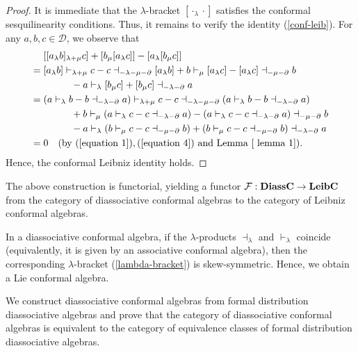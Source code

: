 \documentclass[a4paper,reqno,10pt]{amsart}
\theoremstyle{plain}
\theoremstyle{definition}
\theoremstyle{remark}
\newcommand{\D}{\mathcal{D}}
\newcommand{\la}{\lambda}
\begin{document}
\begin{proof}
It is immediate that the $\la$-bracket $[\cdot_\la \cdot ]$ satisfies the conformal sesquilinearity conditions. Thus, it remains to verify the identity (\ref{conf-leib}). For any $a,b,c\in\D$, we observe that
\begin{align*}
&[[a_{\la}b]_{\la+\mu}c]+[b_{\mu}[a_{\la}c]]-[a_{\la}[b_{\mu}c]]\\
={}&[a_{\la}b]\vdash_{\la+\mu}c
-c\dashv_{-\la-\mu-\partial}[a_{\la}b]
+b\vdash_{\mu}[a_{\la}c]
-[a_{\la}c]\dashv_{-\mu-\partial}b\\
&\hspace{1cm}
-a\vdash_{\la}[b_{\mu}c]
+[b_{\mu}c]\dashv_{-\la-\partial}a\\
={}&(a\vdash_{\la}b-b\dashv_{-\la-\partial}a)\vdash_{\la+\mu}c
-c\dashv_{-\la-\mu-\partial}(a\vdash_{\la}b-b\dashv_{-\la-\partial}a)\\
&\hspace{1cm}
+b\vdash_{\mu}(a\vdash_{\la}c-c\dashv_{-\la-\partial}a)
-(a\vdash_{\la}c-c\dashv_{-\la-\partial}a)\dashv_{-\mu-\partial}b\\
&\hspace{1cm}
-a\vdash_{\la}(b\vdash_{\mu}c-c\dashv_{-\mu-\partial}b)
+(b\vdash_{\mu}c-c\dashv_{-\mu-\partial}b)\dashv_{-\la-\partial}a\\
={}&0 \quad (\text{by } (\ref{equation 1}), (\ref{equation 4}) \text{ and Lemma } \ref{ lemma 1}).
\end{align*} 
Hence, the conformal Leibniz identity holds.
\end{proof}

The above construction is functorial, yielding a functor $\mathcal{F}: {\bf DiassC} \rightarrow {\bf LeibC}$ from the category of diassociative conformal algebras to the category of Leibniz conformal algebras.

In a diassociative conformal algebra, if the $\la$-products $\dashv_\la$ and $\vdash_\la$ coincide (equivalently, it is given by an associative conformal algebra), then the corresponding $\la$-bracket (\ref{lambda-bracket}) is skew-symmetric. Hence, we obtain a Lie conformal algebra.


\medskip
   
   We construct diassociative conformal algebras from formal distribution diassociative algebras and prove that the category of diassociative conformal algebras is equivalent to the category of equivalence classes of formal distribution diassociative algebras. 
 
\end{document}
